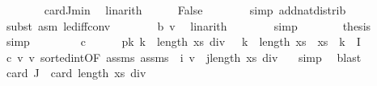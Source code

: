\begin{isabellebody}
\ \ \ \ \ \ \isamarkupfalse%
\ card{\isacharunderscore}{\kern0pt}J{\isacharunderscore}{\kern0pt}min\ \isamarkupfalse%
\ linarith\isanewline
\ \ \ \ \isamarkupfalse%
\ {\isachardoublequoteopen}False{\isachardoublequoteclose}\isanewline
\ \ \ \ \ \ \isamarkupfalse%
\ {\isacharparenleft}{\kern0pt}simp\ add{\isacharcolon}{\kern0pt}nat{\isacharunderscore}{\kern0pt}distrib{\isacharparenright}{\kern0pt}\isanewline
\ \ \ \ \ \ \isamarkupfalse%
\ {\isacharparenleft}{\kern0pt}subst\ {\isacharparenleft}{\kern0pt}asm{\isacharparenright}{\kern0pt}\ le{\isacharunderscore}{\kern0pt}diff{\isacharunderscore}{\kern0pt}conv{}{\isacharparenright}{\kern0pt}\isanewline
\ \ \ \ \ \ \isamarkupfalse%
\ b\ v{\isacharunderscore}{\kern0pt}{}\ \isamarkupfalse%
\ linarith\isanewline
\ \ \ \ \ \ \isamarkupfalse%
\ simp\isanewline
\ \ \ \ \isamarkupfalse%
\ \isamarkupfalse%
\ {\isacharquery}{\kern0pt}thesis\ \isamarkupfalse%
\ simp\isanewline
\ \ \isamarkupfalse%
\isanewline
\ \ \ \ \isamarkupfalse%
\ c\isanewline
\ \ \ \ \isamarkupfalse%
\ p{\isacharcolon}{\kern0pt}{\isachardoublequoteopen}{\isasymAnd}k{\isachardot}{\kern0pt}\ k\ {\isasymge}\ length\ xs\ div\ {}\ {\isasymLongrightarrow}\ k\ {\isacharless}{\kern0pt}\ length\ xs\ {\isasymLongrightarrow}\ xs\ {\isacharbang}{\kern0pt}\ k\ {\isasymnotin}\ I{\isachardoublequoteclose}\isanewline
\ \ \ \ \ \ \isamarkupfalse%
\ c\ v{\isacharunderscore}{\kern0pt}{}\ v{\isacharunderscore}{\kern0pt}{}\ sorted{\isacharunderscore}{\kern0pt}int{\isacharbrackleft}{\kern0pt}OF\ assms{\isacharparenleft}{\kern0pt}{}{\isacharparenright}{\kern0pt}\ assms{\isacharparenleft}{\kern0pt}{}{\isacharparenright}{\kern0pt}{\isacharcomma}{\kern0pt}\ \ i\ {\isacharequal}{\kern0pt}{\isachardoublequoteopen}v{\isachardoublequoteclose}\ \ j{\isacharequal}{\kern0pt}{\isachardoublequoteopen}length\ xs\ div\ {}{\isachardoublequoteclose}{\isacharbrackright}{\kern0pt}\ \isamarkupfalse%
\ simp\ \isamarkupfalse%
\ blast\isanewline
\ \ \ \ \isamarkupfalse%
\ {\isachardoublequoteopen}card\ J\ {\isasymle}\ card\ {\isacharbraceleft}{\kern0pt}{}{\isachardot}{\kern0pt}{\isachardot}{\kern0pt}{\isacharless}{\kern0pt}{\isacharparenleft}{\kern0pt}length\ xs\ div\ {}{\isacharparenright}{\kern0pt}{\isacharbraceright}{\kern0pt}{\isachardoublequoteclose}\isanewline

\end{isabellebody}

